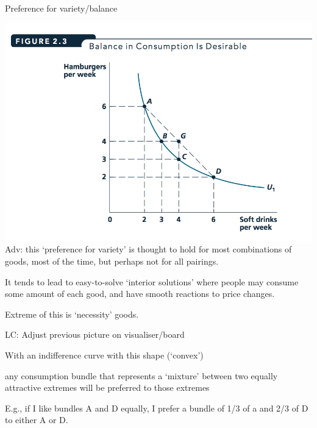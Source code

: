 \documentclass[table]{beamer}
\begin{document}
\begin{frame}

\begin{block}{Preference for variety/balance}

\includegraphics{picsfigs/indifcurvebalance.png}\\

Adv: this `preference for variety' is thought to hold for most
combinations of goods, most of the time, but perhaps not for all
pairings.

It tends to lead to easy-to-solve `interior solutions' where people may
consume some amount of each good, and have smooth reactions to price
changes.

Extreme of this is `necessity' goods.

LC: Adjust previous picture on visualiser/board

With an indifference curve with this shape (`convex')

any consumption bundle that represents a `mixture' between two equally
attractive extremes will be preferred to those extremes

E.g., if I like bundles A and D equally, I prefer a bundle of 1/3 of a
and 2/3 of D to either A or D.

\end{block}

\end{frame}
\end{document}

